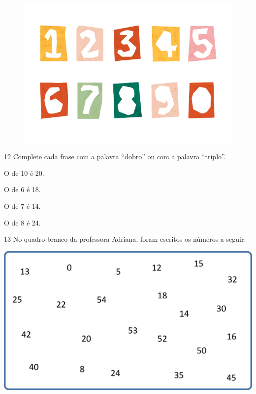 \begin{figure}[htpb!]
\centering
\includegraphics[width=.7\textwidth]{./media/image16c.png}
\end{figure}

\num{12} Complete cada frase com a palavra ``dobro'' ou com a palavra ``triplo''.

\begin{escolha}
\item
  O  de 10 é 20.
\item
  O  de 6 é 18.
\item
  O  de 7 é 14.
\item
  O  de 8 é 24.
\end{escolha}

\pagebreak
\num{13} No quadro branco da professora Adriana, foram escritos os números a seguir:


\vspace{2em}
\includegraphics[width=\textwidth]{./media/image25.png}
\vspace{2em}

